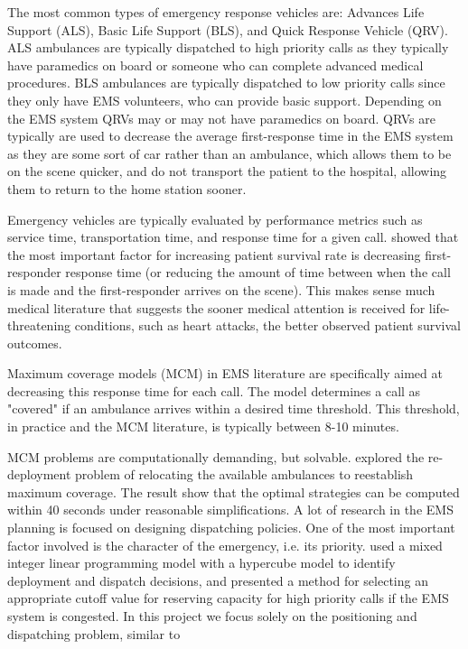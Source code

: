 \documentclass[12pt]{report}
\begin{document}
The most common types of emergency response vehicles are: Advances Life Support (ALS), Basic Life Support (BLS), and Quick Response Vehicle (QRV). ALS ambulances are typically dispatched to high priority calls as they typically have paramedics on board or someone who can complete advanced medical procedures. BLS ambulances are typically dispatched to low priority calls since they only have EMS volunteers, who can provide basic support. Depending on the EMS system QRVs may or may not have paramedics on board. QRVs are typically are used to decrease the average first-response time in the EMS system as they are some sort of car rather than an ambulance, which allows them to be on the scene quicker, and do not transport the patient to the hospital, allowing them to return to the home station sooner.

Emergency vehicles are typically evaluated by performance metrics such as service time, transportation time, and response time for a given call. \citet{Bandara} showed that the most important factor for increasing patient survival rate is decreasing first-responder response time (or reducing the amount of time between when the call is made and the first-responder arrives on the scene). This makes sense much medical literature that suggests the sooner medical attention is received for life-threatening conditions, such as heart attacks, the better observed patient survival outcomes. 

Maximum coverage models (MCM) in EMS literature are specifically aimed at decreasing this response time for each call. The model determines a call as "covered" if an ambulance arrives within a desired time threshold. This threshold, in practice and the MCM literature, is typically between 8-10 minutes. 

MCM problems are computationally demanding, but solvable.
\citet{naoum} explored the re-deployment problem of relocating the available ambulances to reestablish maximum coverage. 
The result show that the optimal strategies can be computed within 40 seconds under reasonable simplifications.
A lot of research in the EMS planning is focused on designing dispatching policies.
One of the most important factor involved is the character of the emergency, i.e. its priority.
\citet{soovin} used a mixed integer linear programming model  with a hypercube  model  to  identify  deployment and dispatch decisions, and presented a method for selecting an appropriate cutoff value for reserving capacity for high priority calls if the EMS system is congested.
In this project we focus solely on the positioning and dispatching problem, similar to \citet{Bouj}
\\
\end{document}
